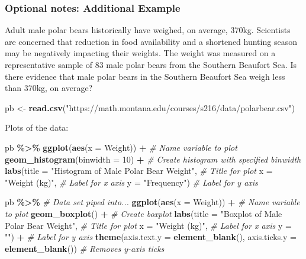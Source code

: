 \documentclass[
]{report}
\newenvironment{Shaded}{\begin{snugshade}}{\end{snugshade}}
\newcommand{\AttributeTok}[1]{\textcolor[rgb]{0.13,0.29,0.53}{#1}}
\newcommand{\CommentTok}[1]{\textcolor[rgb]{0.56,0.35,0.01}{\textit{#1}}}
\newcommand{\DecValTok}[1]{\textcolor[rgb]{0.00,0.00,0.81}{#1}}
\newcommand{\FunctionTok}[1]{\textcolor[rgb]{0.13,0.29,0.53}{\textbf{#1}}}
\newcommand{\NormalTok}[1]{#1}
\newcommand{\OtherTok}[1]{\textcolor[rgb]{0.56,0.35,0.01}{#1}}
\newcommand{\SpecialCharTok}[1]{\textcolor[rgb]{0.81,0.36,0.00}{\textbf{#1}}}
\newcommand{\StringTok}[1]{\textcolor[rgb]{0.31,0.60,0.02}{#1}}
\begin{document}
\subsubsection*{Optional notes: Additional Example}\label{optional-notes-additional-example-6}

Adult male polar bears historically have weighed, on average, 370kg. Scientists are concerned that reduction in food availability and a shortened hunting season may be negatively impacting their weights. The weight was measured on a representative sample of 83 male polar bears from the Southern Beaufort Sea. Is there evidence that male polar bears in the Southern Beaufort Sea weigh less than 370kg, on average?

\begin{Shaded}
\begin{Highlighting}[]
\NormalTok{pb }\OtherTok{\textless{}{-}} \FunctionTok{read.csv}\NormalTok{(}\StringTok{"https://math.montana.edu/courses/s216/data/polarbear.csv"}\NormalTok{)}
\end{Highlighting}
\end{Shaded}

Plots of the data:

\begin{Shaded}
\begin{Highlighting}[]
\NormalTok{pb }\SpecialCharTok{\%\textgreater{}\%}
    \FunctionTok{ggplot}\NormalTok{(}\FunctionTok{aes}\NormalTok{(}\AttributeTok{x =}\NormalTok{ Weight)) }\SpecialCharTok{+}   \CommentTok{\# Name variable to plot}
    \FunctionTok{geom\_histogram}\NormalTok{(}\AttributeTok{binwidth =} \DecValTok{10}\NormalTok{) }\SpecialCharTok{+}  \CommentTok{\# Create histogram with specified binwidth}
    \FunctionTok{labs}\NormalTok{(}\AttributeTok{title =} \StringTok{"Histogram of Male Polar Bear Weight"}\NormalTok{, }\CommentTok{\# Title for plot}
       \AttributeTok{x =} \StringTok{"Weight (kg)"}\NormalTok{, }\CommentTok{\# Label for x axis}
       \AttributeTok{y =} \StringTok{"Frequency"}\NormalTok{) }\CommentTok{\# Label for y axis}

\NormalTok{pb }\SpecialCharTok{\%\textgreater{}\%} \CommentTok{\# Data set piped into...}
\FunctionTok{ggplot}\NormalTok{(}\FunctionTok{aes}\NormalTok{(}\AttributeTok{x =}\NormalTok{ Weight)) }\SpecialCharTok{+}   \CommentTok{\# Name variable to plot}
  \FunctionTok{geom\_boxplot}\NormalTok{() }\SpecialCharTok{+}  \CommentTok{\# Create boxplot}
  \FunctionTok{labs}\NormalTok{(}\AttributeTok{title =} \StringTok{"Boxplot of Male Polar Bear Weight"}\NormalTok{, }\CommentTok{\# Title for plot}
       \AttributeTok{x =} \StringTok{"Weight (kg)"}\NormalTok{, }\CommentTok{\# Label for x axis}
       \AttributeTok{y =} \StringTok{""}\NormalTok{) }\SpecialCharTok{+} \CommentTok{\# Label for y axis  }
    \FunctionTok{theme}\NormalTok{(}\AttributeTok{axis.text.y =} \FunctionTok{element\_blank}\NormalTok{(), }
          \AttributeTok{axis.ticks.y =} \FunctionTok{element\_blank}\NormalTok{()) }\CommentTok{\# Removes y{-}axis ticks}
\end{Highlighting}
\end{Shaded}
\end{document}
